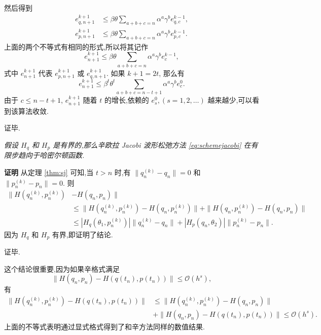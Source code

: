   然后得到
  \begin{equation*}
    \begin{aligned}
      e_{q,n+1}^{k+1}&\le \beta\theta \sum_{a+b+c=n}\alpha^{a}\gamma^{b} e_{q,c}^{k-1},\\
      e_{p,n+1}^{k+1}&\le \beta \theta \sum_{a+b+c=n}\alpha^{a}\gamma^{b} e_{p,c}^{k-1}.
    \end{aligned}
  \end{equation*}
  上面的两个不等式有相同的形式,所以将其记作
  \begin{equation*}
    e_{n+1}^{k+1}\le \beta \theta \sum_{a+b+c=n}\alpha^{a}\gamma^{b} e_{c}^{k-1},
  \end{equation*}
  式中 $e_{n+1}^{k+1}$ 代表 $e_{p,n+1}^{k+1}$ 或 $e_{q,n+1}^{k+1}$. 如果 $k+1=2t$, 那么有
  \begin{equation*}
    e_{n+1}^{k+1}\le \beta^{t} \theta^{t} \sum_{a+b+c=n-t+1}\alpha^{a}\gamma^{b} e_{c}^{0}.
  \end{equation*}
  由于 $c\le n-t+1$, $e_{n+1}^{k+1}$ 随着 $t$ 的增长,依赖的 $e_{s}^{0}, (s= 1,2,\ldots)$ 越来越少,可以看到该算法收敛.

证毕.

\begin{theorem}\label{thm:sym}
\emph{假设 $H_q$ 和 $H_p$ 是有界的,那么辛欧拉 Jacobi 波形松弛方法 \eqref{eq:schemejacobi} 在有限步趋向于哈密尔顿函数.}
\end{theorem}

{\textbf{证明}} 从定理 \ref{thm:sj} 可知,当 $t > n$ 时,有 $\| q_{n}^{(k)}-q_{n} \| = 0$ 和 $\| p_{n}^{(k)}-p_{n} \| = 0$.
  则
  \begin{equation*}
    \begin{aligned}
      \| H(q_n^{(k)},p_n^{(k)}) & - H(q_n,p_n) \| \\
      & \le \| H(q_n^{(k)},p_n^{(k)}) - H(q_n,p_n^{(k)}) \| + \| H(q_n,p_n^{(k)}) - H(q_n,p_n) \| \\
      &\le | H_q(\theta_1,p_n^{(k)}) | \| q_{n}^{(k)}-q_{n} \| + | H_p(q_n,\theta_2) | \| p_{n}^{(k)}-p_{n} \|.
    \end{aligned}
  \end{equation*}
  因为 $H_q$ 和 $H_p$ 有界,即证明了结论.

证毕.

这个结论很重要,因为如果辛格式满足
\begin{equation*}
\| H(q_n,p_n) - H(q(t_n),p(t_n)) \| \le \mathcal{O}(h^s),
\end{equation*}
有
\begin{equation*}
\begin{aligned}
\| H(q_n^{(k)},p_n^{(k)}) - H(q(t_n),p(t_n)) \| & \le  \| H(q_n^{(k)},p_n^{(k)}) - H(q_n,p_n) \| \\
&+ \| H(q_n,p_n) - H(q(t_n),p(t_n)) \| \le \mathcal{O}(h^s).
\end{aligned}
\end{equation*}
上面的不等式表明通过显式格式得到了和辛方法同样的数值结果.

